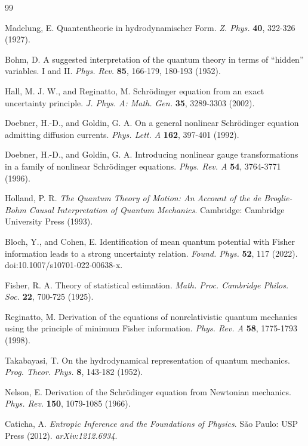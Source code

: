 \documentclass[11pt,a4paper]{article}
\numberwithin{equation}{section}
\theoremstyle{thmcompact}
\theoremstyle{remark}
\begin{document}
\begin{thebibliography}{99}
	
	Madelung, E. Quantentheorie in hydrodynamischer Form. \emph{Z. Phys.} \textbf{40}, 322-326 (1927).
	
	Bohm, D. A suggested interpretation of the quantum theory in terms of ``hidden'' variables. I and II. \emph{Phys. Rev.} \textbf{85}, 166-179, 180-193 (1952).
	
	Hall, M. J. W., and Reginatto, M. Schrödinger equation from an exact uncertainty principle. \emph{J. Phys. A: Math. Gen.} \textbf{35}, 3289-3303 (2002).
	
	Doebner, H.-D., and Goldin, G. A. On a general nonlinear Schrödinger equation admitting diffusion currents. \emph{Phys. Lett. A} \textbf{162}, 397-401 (1992).
	
	Doebner, H.-D., and Goldin, G. A. Introducing nonlinear gauge transformations in a family of nonlinear Schrödinger equations. \emph{Phys. Rev. A} \textbf{54}, 3764-3771 (1996).
	
	Holland, P. R. \emph{The Quantum Theory of Motion: An Account of the de Broglie-Bohm Causal Interpretation of Quantum Mechanics}. Cambridge: Cambridge University Press (1993).
	
	Bloch, Y., and Cohen, E. Identification of mean quantum potential with Fisher information leads to a strong uncertainty relation. \emph{Found. Phys.} \textbf{52}, 117 (2022). doi:10.1007/s10701-022-00638-x.
	
	Fisher, R. A. Theory of statistical estimation. \emph{Math. Proc. Cambridge Philos. Soc.} \textbf{22}, 700-725 (1925).
	
	Reginatto, M. Derivation of the equations of nonrelativistic quantum mechanics using the principle of minimum Fisher information. \emph{Phys. Rev. A} \textbf{58}, 1775-1793 (1998).
	
	Takabayasi, T. On the hydrodynamical representation of quantum mechanics. \emph{Prog. Theor. Phys.} \textbf{8}, 143-182 (1952).
	
	Nelson, E. Derivation of the Schrödinger equation from Newtonian mechanics. \emph{Phys. Rev.} \textbf{150}, 1079-1085 (1966).
	
	Caticha, A. \emph{Entropic Inference and the Foundations of Physics}. São Paulo: USP Press (2012). \emph{arXiv:1212.6934}.
	

\end{thebibliography}
\end{document}
